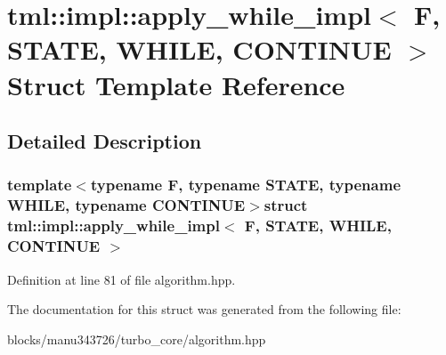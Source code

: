 \hypertarget{structtml_1_1impl_1_1apply__while__impl}{\section{tml\+:\+:impl\+:\+:apply\+\_\+while\+\_\+impl$<$ F, S\+T\+A\+T\+E, W\+H\+I\+L\+E, C\+O\+N\+T\+I\+N\+U\+E $>$ Struct Template Reference}
\label{structtml_1_1impl_1_1apply__while__impl}
}


\subsection{Detailed Description}
\subsubsection*{template$<$typename F, typename S\+T\+A\+T\+E, typename W\+H\+I\+L\+E, typename C\+O\+N\+T\+I\+N\+U\+E$>$struct tml\+::impl\+::apply\+\_\+while\+\_\+impl$<$ F, S\+T\+A\+T\+E, W\+H\+I\+L\+E, C\+O\+N\+T\+I\+N\+U\+E $>$}



Definition at line 81 of file algorithm.\+hpp.



The documentation for this struct was generated from the following file\+:\begin{DoxyCompactItemize}
\item 
blocks/manu343726/turbo\+\_\+core/algorithm.\+hpp\end{DoxyCompactItemize}
